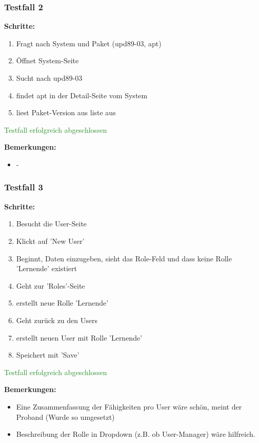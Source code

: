 \subsubsection*{Testfall 2}

\textbf{Schritte:}

\begin{enumerate}
    \item Fragt nach System und Paket (upd89-03, apt)
    \item Öffnet System-Seite
    \item Sucht nach upd89-03
    \item findet apt in der Detail-Seite vom System
    \item liest Paket-Version aus liste aus
\end{enumerate}

\textcolor{ForestGreen}{Testfall erfolgreich abgeschlossen}

\bigskip
\textbf{Bemerkungen:}

\begin{itemize}[noitemsep,nolistsep]
    \item -
\end{itemize}


\subsubsection*{Testfall 3}

\textbf{Schritte:}

\begin{enumerate}
    \item Besucht die User-Seite
    \item Klickt auf 'New User'
    \item Beginnt, Daten einzugeben, sieht das Role-Feld und dass keine Rolle 'Lernende' existiert
    \item Geht zur 'Roles'-Seite
    \item erstellt neue Rolle 'Lernende'
    \item Geht zurück zu den Users
    \item erstellt neuen User mit Rolle 'Lernende'
    \item Speichert mit 'Save'
\end{enumerate}

\textcolor{ForestGreen}{Testfall erfolgreich abgeschlossen}

\bigskip
\textbf{Bemerkungen:}

\begin{itemize}[noitemsep,nolistsep]
    \item Eine Zusammenfassung der Fähigkeiten pro User wäre schön, meint der Proband (Wurde so umgesetzt)
    \item Beschreibung der Rolle in Dropdown (z.B. ob User-Manager) wäre hilfreich.
\end{itemize}


